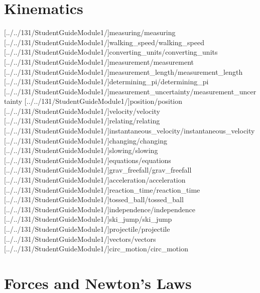 \documentclass[english,twoside]{article}
\begin{document}


\setcounter{tocdepth}{1}\tableofcontents{}
\cleardoublepage

\ForOneTwentyFivetrue

\part{Kinematics}

[../../131/StudentGuideModule1/]{measuring/measuring} 
[../../131/StudentGuideModule1/]{walking_speed/walking_speed}
[../../131/StudentGuideModule1/]{converting_units/converting_units}
[../../131/StudentGuideModule1/]{measurement/measurement}
[../../131/StudentGuideModule1/]{measurement_length/measurement_length}
[../../131/StudentGuideModule1/]{determining_pi/determining_pi}
[../../131/StudentGuideModule1/]{measurement_uncertainty/measurement_uncertainty}
[../../131/StudentGuideModule1/]{position/position}
[../../131/StudentGuideModule1/]{velocity/velocity}
[../../131/StudentGuideModule1/]{relating/relating}
[../../131/StudentGuideModule1/]{instantaneous_velocity/instantaneous_velocity} %
[../../131/StudentGuideModule1/]{changing/changing}
[../../131/StudentGuideModule1/]{slowing/slowing}
[../../131/StudentGuideModule1/]{equations/equations} %
[../../131/StudentGuideModule1/]{grav_freefall/grav_freefall}
[../../131/StudentGuideModule1/]{acceleration/acceleration}
[../../131/StudentGuideModule1/]{reaction_time/reaction_time}
[../../131/StudentGuideModule1/]{tossed_ball/tossed_ball}
[../../131/StudentGuideModule1/]{independence/independence}
[../../131/StudentGuideModule1/]{ski_jump/ski_jump}
[../../131/StudentGuideModule1/]{projectile/projectile}
[../../131/StudentGuideModule1/]{vectors/vectors}
[../../131/StudentGuideModule1/]{circ_motion/circ_motion}

\part{Forces and Newton's Laws}
\end{document}
